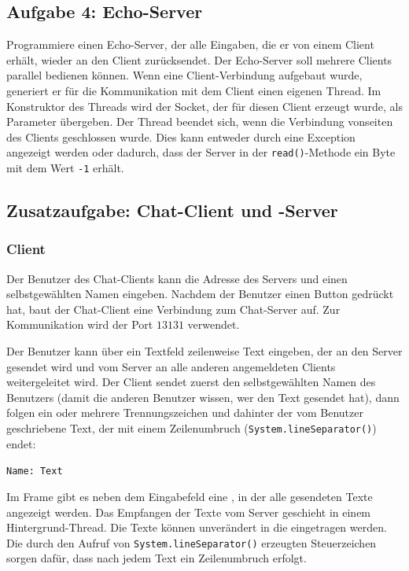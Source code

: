 \subsection{Aufgabe 4: Echo-Server}

Programmiere einen Echo-Server, der alle Eingaben, die er von einem Client
erhält, wieder an den Client zurücksendet. Der Echo-Server soll mehrere
Clients parallel bedienen können. Wenn eine Client-Verbindung aufgebaut wurde,
generiert er für die Kommunikation mit dem Client einen eigenen Thread. Im
Konstruktor des Threads wird der Socket, der für diesen Client erzeugt wurde,
als Parameter übergeben. Der Thread beendet sich, wenn die Verbindung vonseiten
des Clients geschlossen wurde. Dies kann entweder durch eine Exception
angezeigt werden oder dadurch, dass der Server in der \lstinline|read()|-Methode
ein Byte mit dem Wert \lstinline|-1| erhält.


\subsection{Zusatzaufgabe: Chat-Client und -Server}

\subsubsection{Client}

Der Benutzer des Chat-Clients kann die Adresse des Servers und einen
selbstgewählten Namen eingeben. Nachdem der Benutzer einen Button gedrückt hat, baut
der Chat-Client eine Verbindung zum Chat-Server auf. Zur Kommunikation wird der 
Port $13131$ verwendet.

Der Benutzer kann über ein Textfeld zeilenweise Text eingeben, der an den
Server gesendet wird und vom Server an alle anderen angemeldeten Clients
weitergeleitet wird. Der Client sendet zuerst den selbstgewählten Namen des Benutzers
(damit die anderen Benutzer wissen, wer den Text gesendet hat), dann folgen ein
oder mehrere Trennungszeichen und dahinter der vom Benutzer geschriebene Text,
der mit einem Zeilenumbruch (\lstinline|System.lineSeparator()|) endet:

\lstinline|Name: Text|

Im Frame gibt es neben dem Eingabefeld eine , in der alle
gesendeten Texte angezeigt werden. Das Empfangen der Texte vom Server geschieht
in einem Hintergrund-Thread. Die Texte können unverändert in die
 eingetragen werden. Die durch den Aufruf von
\lstinline|System.lineSeparator()| erzeugten Steuerzeichen sorgen dafür, dass
nach jedem Text ein Zeilenumbruch erfolgt.

